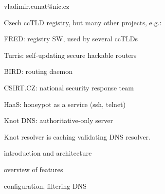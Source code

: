 
\englishenv

\pageAspectRatio[16:9]

\subtitle{\bigskip{}}
\author{Vladimir Cunat}{vladimir.cunat@nic.cz}
\date[2018-05-23]


Czech ccTLD registry,
but many other projects, e.g.:
\bulletList
\item FRED: registry SW, used by several ccTLDs
\item Turris: self-updating secure hackable routers
\item BIRD: routing daemon
\item CSIRT.CZ: national security response team
\item HaaS: honeypot as a service (ssh, telnet)
\item Knot DNS: authoritative-only server
\endBulletList


\slide[Contents]
Knot resolver is caching validating DNS resolver.

\bulletList
\item introduction and architecture
\item overview of features
\item configuration, filtering DNS
\endBulletList


